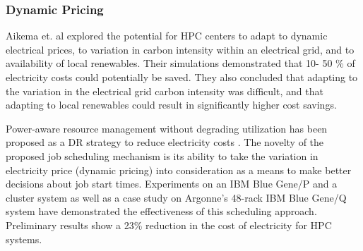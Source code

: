 \subsubsection{Dynamic Pricing}
Aikema et. al \cite{aikema_electrical_2011} explored the potential for HPC centers to adapt to dynamic electrical prices, to variation in carbon intensity within an electrical grid, and to availability of local renewables. Their simulations demonstrated that 10- 50 \% of electricity costs could potentially be saved. They also concluded that adapting to the variation in the electrical grid carbon intensity was difficult, and that adapting to local renewables could result in significantly higher cost savings.

Power-aware resource management without degrading utilization has been proposed as a DR strategy to reduce electricity costs \cite{yang_integrating_2013,zhou_reducing_2013}. The novelty of the proposed job scheduling mechanism is its ability to take the variation in electricity price (dynamic pricing) into consideration as a means to make better decisions about job start times. Experiments on an IBM Blue Gene/P and a cluster system as well as a case study on Argonne's 48-rack IBM Blue Gene/Q system have demonstrated the effectiveness of this scheduling approach. Preliminary results show a 23\% reduction in the cost of electricity for HPC systems.
